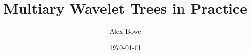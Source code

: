 \documentclass[a4paper]{report}
\begin{document}
\title{Multiary Wavelet Trees in Practice}
\author{Alex Bowe}
\date{\today}


\maketitle



\begin{abstract}

\end{abstract}










\end{document}
